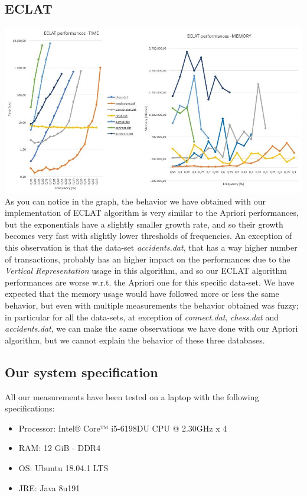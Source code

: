 \documentclass[11pt, a4paper]{article}
\begin{document}
		\subsection{ECLAT}
			\includegraphics[scale =0.6]{ECLAT.JPG}
			\newline
			As you can notice in the graph, the behavior we have obtained with our implementation of ECLAT algorithm is very similar to the Apriori performances, but the exponentials have a slightly smaller growth rate, and so their growth becomes very fast with slightly lower thresholds of frequencies.
			An exception of this observation is that the data-set \textit{accidents.dat}, that has a way higher number of transactions, probably has an higher impact on the performances due to the \textit{Vertical Representation} usage in this algorithm, and so our ECLAT algorithm performances are worse w.r.t. the Apriori one for this specific data-set.
			We have expected that the memory usage would have followed more or less the same behavior, but even with multiple measurements the behavior obtained was fuzzy; in particular for all the data-sets, at exception of \textit{connect.dat}, \textit{chess.dat} and \textit{accidents.dat},  we can make the same observations we have done with our Apriori algorithm, but we cannot explain the behavior of these three databases.
			
			\noindent
		\subsection{Our system specification}
			All our measurements have been tested on a laptop with the following specifications:
			\begin{multicols}{2}
				\begin{itemize}
					\item Processor: Intel® Core™ i5-6198DU CPU @ 2.30GHz x 4 
					\item RAM: 12 GiB - DDR4
					\item OS: Ubuntu 18.04.1 LTS
					\item JRE: Java 8u191
				\end{itemize}
			\end{multicols}
			
\end{document}
